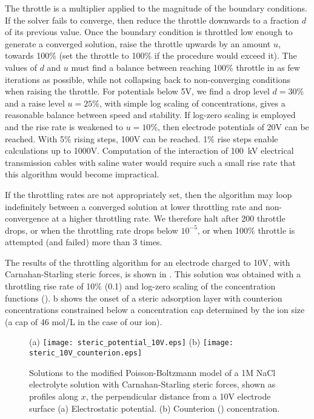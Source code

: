 The throttle is a multiplier
applied to the magnitude of the boundary conditions.
If the solver fails to converge, then reduce the throttle downwards to
a fraction $d$ of its previous value. Once the boundary
condition is throttled low enough to generate a converged solution, raise
the throttle upwards by an amount $u$, towards 100\% (set the throttle
to 100\% if the procedure would exceed it).  The values of $d$ and $u$
must find a balance between reaching 100\% throttle in as few
iterations as possible, while not collapsing back to non-converging
conditions when raising the throttle.  For potentials below 5V, we
find a drop level $d=30\%$ and a raise level $u=25\%$, with simple log
scaling of concentrations, gives a reasonable balance between speed and
stability. If log-zero scaling is employed and the rise rate is
weakened to $u=10\%$, then electrode potentials of 20V can be
reached. With 5\% rising steps, 100V can be reached. 1\% rise steps
enable calculations up to 1000V. Computation of the interaction of
100~kV electrical transmission cables with saline water would require such a small rise rate
that this algorithm would become impractical.

If the throttling rates are not appropriately set, then the algorithm
may loop indefinitely between a converged solution at lower throttling
rate and non-convergence at a higher throttling rate. We therefore
halt after 200 throttle drops, or when the throttling rate drops below
$10^{-5}$, or when 100\% throttle is attempted (and failed) more than 3 times.

The results of the throttling algorithm for an electrode charged to
10V, with Carnahan-Starling steric forces, is shown in
. This solution was obtained with a
throttling rise rate of 10\% (0.1) and log-zero scaling of the
concentration functions
(). b shows the onset
of a steric adsorption layer \cite{DagmawiParsons2022} with counterion
concentrations constrained below a concentration cap determined by the
ion size (a cap of 46 mol/L in the case of our  ion).

\begin{figure}
\centering
(a)
\texttt{[image: steric\_potential\_10V.eps]}
(b)
\texttt{[image: steric\_10V\_counterion.eps]}
\caption{\label{fig_results_throttling}Solutions to the modified
  Poisson-Boltzmann model of a 1M NaCl electrolyte solution with
  Carnahan-Starling steric forces, shown as profiles along $x$, the
  perpendicular distance from a 10V electrode surface (a) Electrostatic
  potential. (b) Counterion () concentration. }
\end{figure}

